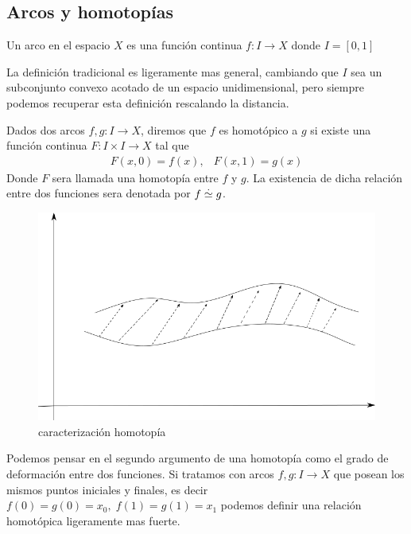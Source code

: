 \subsection{Arcos y homotopías}
\begin{definicion}[Arco]
  Un arco en el espacio \(X\) es una función continua \(f : I \to X \)
  donde \(I = [0,1]\)
\end{definicion}
La definición tradicional es ligeramente mas general, cambiando que \(I\)
sea un subconjunto convexo acotado de un espacio unidimensional, pero
siempre podemos recuperar esta definición rescalando la distancia.

\begin{definicion}[Homotopía]
  Dados dos arcos \(f,g : I \to X\), diremos que \(f\) es homotópico a
  \(g\) si existe una función continua \(F : I \times I \to X \) tal que
  \[ \begin{matrix}
      F (x, 0) = f(x), & F (x, 1) = g(x)
     \end{matrix}
  \]
  Donde \(F\) sera llamada una homotopía entre \(f\) y \(g\). La
  existencia de dicha relación entre dos funciones sera denotada por \(f
  \stackrel{.}{\simeq} g\).
\end{definicion}
\begin{figure}[h]
  \centering
  \includegraphics[scale=0.3]{./imagenes/homotopia.png}
  \caption{caracterización homotopía}
  \label{fig:homotopia-entre-funciones}
\end{figure}
Podemos pensar en el segundo argumento de una homotopía como el grado de
deformación entre dos funciones.
Si tratamos con arcos \(f,g : I \to X\) que posean los mismos puntos
iniciales y finales, es decir \(f(0) = g(0) = x_0, \; f(1) = g(1) =
x_1 \) podemos definir una relación homotópica ligeramente mas fuerte.

